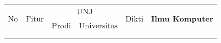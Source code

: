 \begin{table}[H]
\centering
	\begin{tabular}{llllll}
		\hline
		\multicolumn{1}{|c|}{\multirow{2}{*}{No}} & \multicolumn{1}{l|}{\multirow{2}{*}{Fitur}} & \multicolumn{2}{c|}{UNJ}                                      & \multicolumn{1}{l|}{\multirow{2}{*}{Dikti}} & \multicolumn{1}{c|}{\multirow{2}{*}{\textbf{Ilmu Komputer}}} \\ \cline{3-4}
		\multicolumn{1}{|c|}{}                    & \multicolumn{1}{l|}{}                       & \multicolumn{1}{c|}{Prodi} & \multicolumn{1}{c|}{Universitas} & \multicolumn{1}{l|}{}                       & \multicolumn{1}{c|}{}                                        \\ \hline
		&                                             &                            &                                  &                                             &                                                              \\
		&                                             &                            &                                  &                                             &                                                             
	\end{tabular}
\end{table}